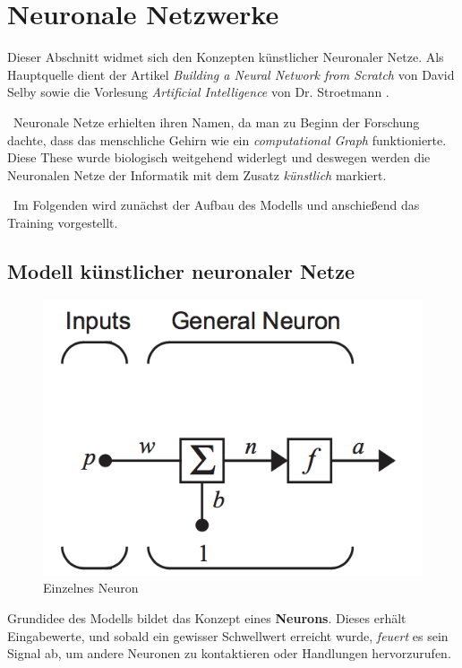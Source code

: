 \newpage
\section{Neuronale Netzwerke}
\label{sec:NN}
Dieser Abschnitt widmet sich den Konzepten künstlicher Neuronaler Netze. Als Hauptquelle dient der Artikel \textit{Building a Neural Network from Scratch} von David Selby \cite{SelbyNN} sowie die Vorlesung \textit{Artificial Intelligence} von Dr. Stroetmann \cite{stroetmann}.

~\newline Neuronale Netze erhielten ihren Namen, da man zu Beginn der Forschung dachte, dass das menschliche Gehirn wie ein \textit{computational Graph} funktionierte. Diese These wurde biologisch weitgehend widerlegt und deswegen werden die Neuronalen Netze der Informatik mit dem Zusatz \textit{künstlich} markiert. 

~\newline Im Folgenden wird zunächst der Aufbau des Modells und anschießend das Training vorgestellt.
\subsection{Modell künstlicher neuronaler Netze}
\begin{figure}[h]
	\begin{center}
		\includegraphics[width=0.4\linewidth]{Bilder/singleNeuron}
		\caption[Einzelnes Neuron: \url{
			http://caisplusplus.usc.edu/blog/curriculum/lesson4}]{Einzelnes Neuron}
		\label{fig:Neuron}
	\end{center}
\end{figure}

Grundidee des Modells bildet das Konzept eines \textbf{Neurons}. Dieses erhält Eingabewerte, und sobald ein gewisser Schwellwert erreicht wurde, \textit{feuert} es sein Signal ab, um andere Neuronen zu kontaktieren oder Handlungen hervorzurufen. 

